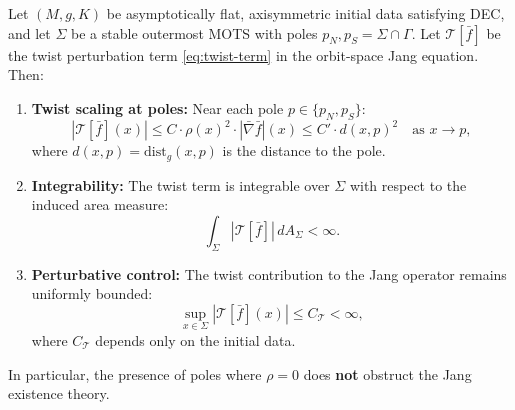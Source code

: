 \begin{lemma}\label{lem:twist-bound-poles}
Let $(M, g, K)$ be asymptotically flat, axisymmetric initial data satisfying DEC, and let $\Sigma$ be a stable outermost MOTS with poles $p_N, p_S = \Sigma \cap \Gamma$. Let $\mathcal{T}[\bar{f}]$ be the twist perturbation term \eqref{eq:twist-term} in the orbit-space Jang equation. Then:
\begin{enumerate}[label=\textup{(\roman*)}]
    \item \textbf{Twist scaling at poles:} Near each pole $p \in \{p_N, p_S\}$:
    \begin{equation}\label{eq:twist-pole-scaling}
    |\mathcal{T}[\bar{f}](x)| \leq C \cdot \rho(x)^2 \cdot |\bar{\nabla}\bar{f}|(x) \leq C' \cdot d(x,p)^2 \quad \text{as } x \to p,
    \end{equation}
    where $d(x,p) = \mathrm{dist}_g(x,p)$ is the distance to the pole.
    \item \textbf{Integrability:} The twist term is integrable over $\Sigma$ with respect to the induced area measure:
    \begin{equation}
    \int_\Sigma |\mathcal{T}[\bar{f}]| \, dA_\Sigma < \infty.
    \end{equation}
    \item \textbf{Perturbative control:} The twist contribution to the Jang operator remains uniformly bounded:
    \begin{equation}
    \sup_{x \in \Sigma} |\mathcal{T}[\bar{f}](x)| \leq C_\mathcal{T} < \infty,
    \end{equation}
    where $C_\mathcal{T}$ depends only on the initial data.
\end{enumerate}
In particular, the presence of poles where $\rho = 0$ does \textbf{not} obstruct the Jang existence theory.
\end{lemma}

